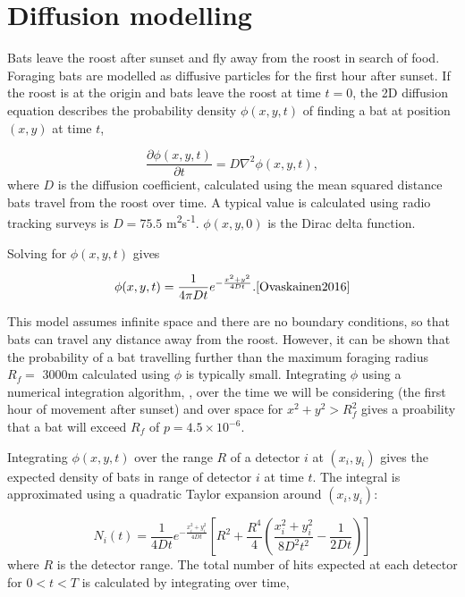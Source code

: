 \documentclass{article}
\begin{document}
\section{Diffusion modelling}

Bats leave the roost after sunset and fly away from the roost in search of food.
Foraging bats are modelled as diffusive particles for the first hour after
sunset. If the roost is at the origin and bats leave the roost at time $t =0$,
the 2D diffusion equation describes the probability density $\phi(x,y,t)$ of
finding a bat at position $(x,y)$ at time $t$,

\begin{equation}
  \frac{\partial \phi(x,y,t)}{\partial t} = D \nabla^2 \phi(x,y,t) ,
  \nonumber
\end{equation}
%
where $D$ is the diffusion coefficient, calculated using the mean squared distance bats travel from the roost over time. A typical value is calculated using radio tracking surveys is $D = 75.5$ m\textsuperscript{2}s\textsuperscript{-1}. $\phi(x,y,0)$ is
the Dirac delta function.

Solving for $\phi(x,y,t)$ gives

\begin{equation}
  \phi(x,y,t) = \frac{1}{4 \pi D t} e^{-\frac{x^2 + y^2}{4Dt}}. \cite{Ovaskainen2016}
  \nonumber
\end{equation}

This model assumes infinite space and there are no boundary conditions, so that bats can travel any distance away from the roost. However, it can be shown that the probability of a bat travelling further than the maximum foraging radius $R_f =$ 3000m calculated using $\phi$ is typically small. Integrating $\phi$ using a numerical integration algorithm, \cite{Berntsen1991}, over the time we will be considering (the first hour of movement after sunset) and over space for $x^2 + y^2 > R_f^2$ gives a proability that a bat will exceed $R_f$ of $p = 4.5 \times 10^{-6}$.

Integrating $\phi(x,y,t)$ over the range $R$ of a detector $i$ at $(x_i, y_i)$ gives
the expected density of bats in range of detector $i$ at time $t$. The
integral is approximated using a quadratic Taylor expansion around $(x_i, y_i)$:


\begin{equation}
  N_i(t) = \frac{1}{4Dt} e^{-\frac{x_i^2 + y_i^2}{4Dt}} \left[ R^2 + \frac{R^4}{4} \left( \frac{x_i^2 + y_i^2}{8D^2t^2} - \frac{1}{2Dt} \right)\right]
\end{equation}
%
where $R$ is the detector range. The total number of hits expected at each
detector for $0 < t < T$ is calculated by integrating over time,
\end{document}
